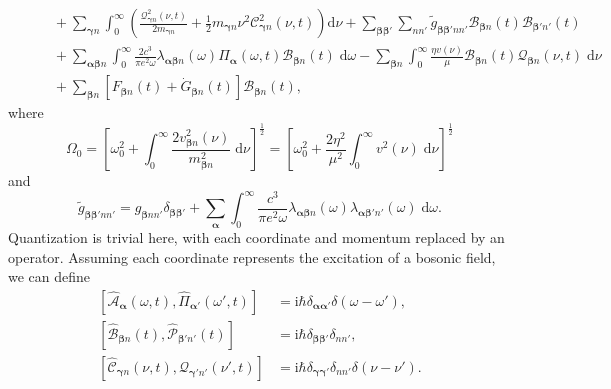 \documentclass{article}
\begin{document}
\begin{equation}
\begin{split}
&\qquad + \sum_{\bm{\gamma}n}\int_0^\infty\left(\frac{\mathcal{Q}_{\bm{\gamma}n}^2(\nu,t)}{2m_{\bm{\gamma}n}} + \frac{1}{2}m_{\bm{\gamma}n}\nu^2\mathcal{C}_{\bm{\gamma}n}^2(\nu,t)\right)\mathrm{d}\nu + \sum_{\bm{\beta}\bm{\beta}'}\sum_{nn'}\tilde{g}_{\bm{\beta}\bm{\beta}'nn'}\mathcal{B}_{\bm{\beta}n}(t)\mathcal{B}_{\bm{\beta}'n'}(t)\\
&\qquad + \sum_{\bm{\alpha}\bm{\beta}n}\int_0^\infty\frac{2c^3}{\pi e^2\omega}\lambda_{\bm{\alpha}\bm{\beta}n}(\omega)\mathit{\Pi}_{\bm{\alpha}}(\omega,t)\mathcal{B}_{\bm{\beta}n}(t)\;\mathrm{d}\omega - \sum_{\bm{\beta}n}\int_0^\infty\frac{\eta v(\nu)}{\mu}\mathcal{B}_{\bm{\beta}n}(t)\mathcal{Q}_{\bm{\beta}n}(\nu,t)\;\mathrm{d}\nu\\
&\qquad + \sum_{\bm{\beta}n}\left[F_{\bm{\beta}n}(t) + \dot{G}_{\bm{\beta}n}(t)\right]\mathcal{B}_{\bm{\beta}n}(t),
\end{split}
\end{equation}
where
\begin{equation}
\Omega_0 = \left[\omega_0^2 + \int_0^\infty\frac{2v_{\bm{\beta}n}^2(\nu)}{m_{\bm{\beta}n}^2}\;\mathrm{d}\nu\right]^\frac{1}{2} = \left[\omega_0^2 + \frac{2\eta^2}{\mu^2}\int_0^\infty v^2(\nu)\;\mathrm{d}\nu\right]^\frac{1}{2}
\end{equation}
and
\begin{equation}
\tilde{g}_{\bm{\beta}\bm{\beta}'nn'} = g_{\bm{\beta}nn'}\delta_{\bm{\beta}\bm{\beta}'} + \sum_{\bm{\alpha}}\int_0^\infty\frac{c^3}{\pi e^2\omega}\lambda_{\bm{\alpha}\bm{\beta}n}(\omega)\lambda_{\bm{\alpha}\bm{\beta}'n'}(\omega)\;\mathrm{d}\omega.
\end{equation}
Quantization is trivial here, with each coordinate and momentum replaced by an operator. Assuming each coordinate represents the excitation of a bosonic field, we can define
\begin{equation}
\begin{split}
\left[\hat{\mathcal{A}}_{\bm{\alpha}}(\omega,t),\hat{\mathit{\Pi}}_{\bm{\alpha}'}(\omega',t)\right] &= \mathrm{i}\hbar\delta_{\bm{\alpha}\bm{\alpha}'}\delta(\omega - \omega'),\\
\left[\hat{\mathcal{B}}_{\bm{\beta}n}(t),\hat{\mathcal{P}}_{\bm{\beta}'n'}(t)\right] &= \mathrm{i}\hbar\delta_{\bm{\beta}\bm{\beta}'}\delta_{nn'},\\
\left[\hat{\mathcal{C}}_{\bm{\gamma}n}(\nu,t),\hat{\mathcal{Q}}_{\bm{\gamma'}n'}(\nu',t)\right] &= \mathrm{i}\hbar\delta_{\bm{\gamma}\bm{\gamma}'}\delta_{nn'}\delta(\nu - \nu').
\end{split}
\end{equation}
\end{document}
